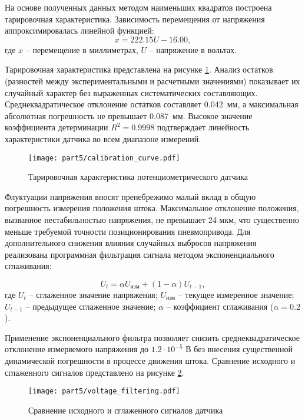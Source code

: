 На основе полученных данных методом наименьших квадратов построена
тарировочная характеристика. Зависимость перемещения от напряжения аппроксимировалась линейной функцией:
\begin{equation}
	x = \num{222.15}U - \num{16.00},
\end{equation}
где $x$ -- перемещение в миллиметрах, $U$ -- напряжение в вольтах.

Тарировочная характеристика представлена на рисунке \ref{fig:calibration}.
Анализ остатков (разностей между экспериментальными и расчетными значениями) показывает их
случайный характер без выраженных систематических составляющих. Среднеквадратическое отклонение остатков
составляет \num{0.042}~мм, а максимальная абсолютная погрешность не превышает \num{0.087}~мм. Высокое значение
коэффициента детерминации $R^2 = \num{0.9998}$ подтверждает линейность характеристики датчика во всем диапазоне измерений.


\begin{figure}[ht]
	\centering
	\texttt{[image: part5/calibration\_curve.pdf]}
	\caption{Тарировочная характеристика потенциометрического датчика}\label{fig:calibration}
\end{figure}

Флуктуации напряжения вносят пренебрежимо малый вклад в общую погрешность измерения положения штока.
Максимальное отклонение положения, вызванное нестабильностью напряжения, не превышает 24 мкм, что
существенно меньше требуемой точности позиционирования пневмопривода. Для дополнительного снижения
влияния случайных выбросов напряжения реализована программная фильтрация сигнала методом экспоненциального сглаживания:

\begin{equation}
	U_t = \alpha U_{изм} + (1-\alpha)U_{t-1},
\end{equation}
где $U_t$ -- сглаженное значение напряжения;
$U_{изм}$ -- текущее измеренное значение;
$U_{t-1}$ -- предыдущее сглаженное значение;
$\alpha$ -- коэффициент сглаживания ($\alpha = \num{0.2}$).

Применение экспоненциального фильтра позволяет снизить среднеквадратическое отклонение измеряемого напряжения до $\num{1.2} \cdot 10^{-5}$ В без
внесения существенной динамической погрешности в процессе движения штока. Сравнение исходного и сглаженного сигналов представлено на рисунке \ref{fig:voltage_filtering}.
\begin{figure}[ht]
	\centering
	\texttt{[image: part5/voltage\_filtering.pdf]}
	\caption{Сравнение исходного и сглаженного сигналов датчика}\label{fig:voltage_filtering}
\end{figure}


